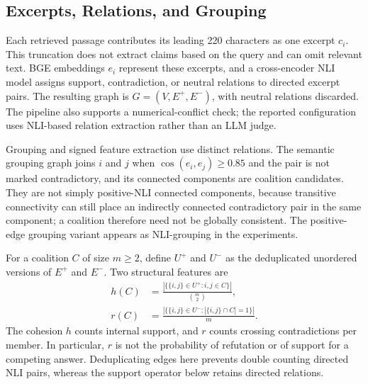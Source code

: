 \documentclass[sigconf]{aamas}
\begin{document}
\subsection{Excerpts, Relations, and Grouping}
Each retrieved passage contributes its leading 220 characters as one excerpt $c_i$. This truncation does not extract claims based on the query and can omit relevant text. BGE embeddings $e_i$ represent these excerpts, and a cross-encoder NLI model assigns support, contradiction, or neutral relations to directed excerpt pairs. The resulting graph is $G=(V,E^+,E^-)$, with neutral relations discarded. The pipeline also supports a numerical-conflict check; the reported configuration uses NLI-based relation extraction rather than an LLM judge.

Grouping and signed feature extraction use distinct relations. The semantic grouping graph joins $i$ and $j$ when $\cos(e_i,e_j)\geq0.85$ and the pair is not marked contradictory, and its connected components are coalition candidates. They are not simply positive-NLI connected components, because transitive connectivity can still place an indirectly connected contradictory pair in the same component; a coalition therefore need not be globally consistent. The positive-edge grouping variant appears as NLI-grouping in the experiments.

For a coalition $C$ of size $m\geq2$, define $U^+$ and $U^-$ as the deduplicated unordered versions of $E^+$ and $E^-$. Two structural features are
\begin{align}
h(C)&=\frac{|\{\{i,j\}\in U^+:i,j\in C\}|}{\binom{m}{2}},\\
r(C)&=\frac{|\{\{i,j\}\in U^-:|\{i,j\}\cap C|=1\}|}{m}.
\end{align}
The cohesion $h$ counts internal support, and $r$ counts crossing contradictions per member. In particular, $r$ is not the probability of refutation or of support for a competing answer. Deduplicating edges here prevents double counting directed NLI pairs, whereas the support operator below retains directed relations.
\end{document}
